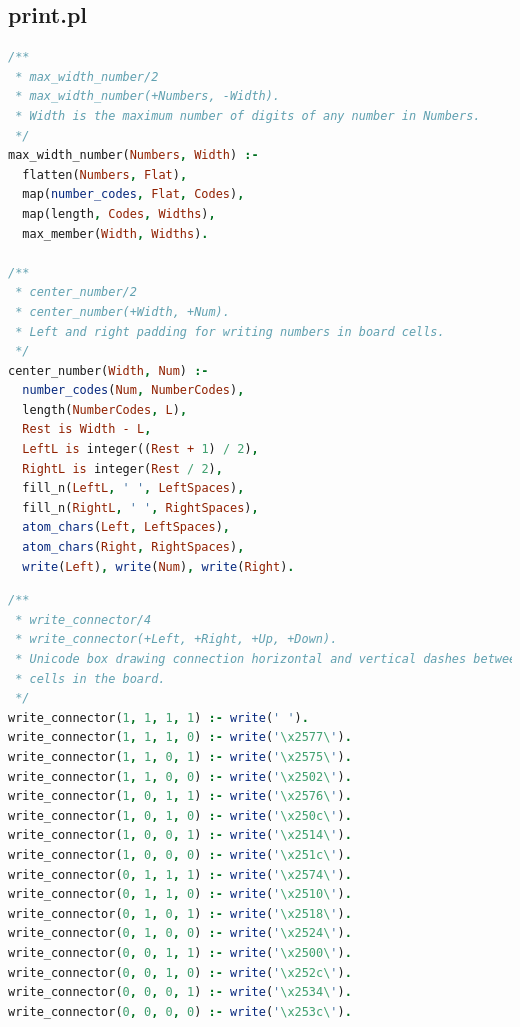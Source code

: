 \documentclass[runningheads]{llncs}
\begin{document}
\subsection{print.pl}

\begin{center}
\begin{minipage}{0.85\textwidth}
\centering\ttfamily
\begin{lstlisting}[language=Prolog]
/**
 * max_width_number/2
 * max_width_number(+Numbers, -Width).
 * Width is the maximum number of digits of any number in Numbers.
 */
max_width_number(Numbers, Width) :-
  flatten(Numbers, Flat),
  map(number_codes, Flat, Codes),
  map(length, Codes, Widths),
  max_member(Width, Widths).

/**
 * center_number/2
 * center_number(+Width, +Num).
 * Left and right padding for writing numbers in board cells.
 */
center_number(Width, Num) :-
  number_codes(Num, NumberCodes),
  length(NumberCodes, L),
  Rest is Width - L,
  LeftL is integer((Rest + 1) / 2),
  RightL is integer(Rest / 2),
  fill_n(LeftL, ' ', LeftSpaces),
  fill_n(RightL, ' ', RightSpaces),
  atom_chars(Left, LeftSpaces),
  atom_chars(Right, RightSpaces),
  write(Left), write(Num), write(Right).
\end{lstlisting}
\end{minipage}
\end{center}
  
\begin{center}
\begin{minipage}{0.85\textwidth}
\centering\ttfamily
\begin{lstlisting}[language=Prolog]
/**
 * write_connector/4
 * write_connector(+Left, +Right, +Up, +Down).
 * Unicode box drawing connection horizontal and vertical dashes between
 * cells in the board.
 */
write_connector(1, 1, 1, 1) :- write(' ').
write_connector(1, 1, 1, 0) :- write('\x2577\').
write_connector(1, 1, 0, 1) :- write('\x2575\').
write_connector(1, 1, 0, 0) :- write('\x2502\').
write_connector(1, 0, 1, 1) :- write('\x2576\').
write_connector(1, 0, 1, 0) :- write('\x250c\').
write_connector(1, 0, 0, 1) :- write('\x2514\').
write_connector(1, 0, 0, 0) :- write('\x251c\').
write_connector(0, 1, 1, 1) :- write('\x2574\').
write_connector(0, 1, 1, 0) :- write('\x2510\').
write_connector(0, 1, 0, 1) :- write('\x2518\').
write_connector(0, 1, 0, 0) :- write('\x2524\').
write_connector(0, 0, 1, 1) :- write('\x2500\').
write_connector(0, 0, 1, 0) :- write('\x252c\').
write_connector(0, 0, 0, 1) :- write('\x2534\').
write_connector(0, 0, 0, 0) :- write('\x253c\').
\end{lstlisting}
\end{minipage}
\end{center}
\end{document}
